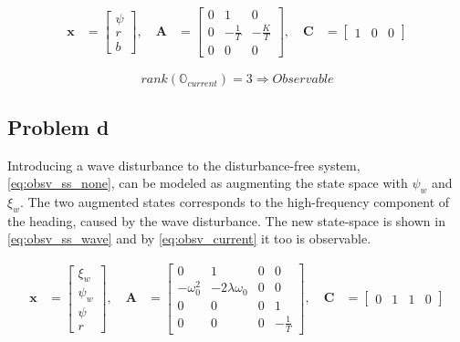 \begin{equation}\label{eq:obsv_ss_current}
\begin{aligned}
\mathbf{x} &= \begin{bmatrix} \psi \\ r \\ b \end{bmatrix},
\quad \mathbf{A} &= \begin{bmatrix} 0 & 1 & 0 \\ 0 & -\frac{1}{T} & -\frac{K}{T} \\ 0 & 0 & 0  \end{bmatrix},
\quad \mathbf{C} &= \begin{bmatrix} 1 & 0 & 0 \end{bmatrix}
\end{aligned}
\end{equation}

\begin{equation}\label{eq:obsv_current}
    rank(\mathbb{O}_{current}) = 3 \Rightarrow Observable
\end{equation}

\subsection{Problem d}
Introducing a wave disturbance to the disturbance-free system, \cref{eq:obsv_ss_none}, can be modeled as augmenting the state space with $\psi_w$ and $\xi_w$. The two augmented states corresponds to the high-frequency component of the heading, caused by the wave disturbance. The new state-space is shown in \cref{eq:obsv_ss_wave} and by \cref{eq:obsv_current} it too is observable.

\begin{equation}\label{eq:obsv_ss_wave}
\begin{aligned}
\mathbf{x} &= \begin{bmatrix}\xi_w \\ \psi_w \\ \psi \\ r \end{bmatrix},
\quad \mathbf{A} &= \begin{bmatrix} 0 & 1 & 0 & 0 \\ -\omega_0^2 & -2\lambda\omega_0 & 0 & 0 \\ 0 & 0 & 0 & 1 \\ 0 & 0 & 0 & -\frac{1}{T}   \end{bmatrix},
\quad \mathbf{C} &= \begin{bmatrix} 0 & 1 & 1 & 0 \end{bmatrix}
\end{aligned}
\end{equation}

